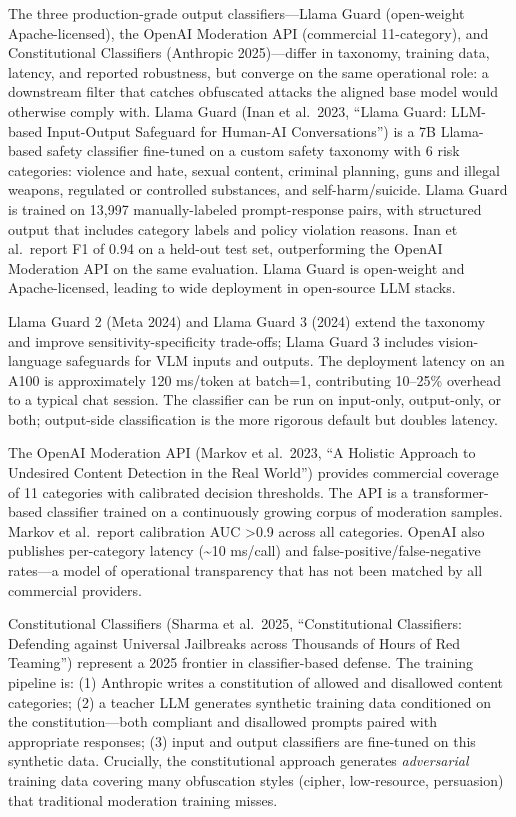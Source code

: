 The three production-grade output classifiers---Llama Guard (open-weight Apache-licensed), the OpenAI Moderation API (commercial 11-category), and Constitutional Classifiers (Anthropic 2025)---differ in taxonomy, training data, latency, and reported robustness, but converge on the same operational role: a downstream filter that catches obfuscated attacks the aligned base model would otherwise comply with. Llama Guard (Inan et al.~2023, ``Llama Guard: LLM-based Input-Output Safeguard for Human-AI Conversations'') is a 7B Llama-based safety classifier fine-tuned on a custom safety taxonomy with 6 risk categories: violence and hate, sexual content, criminal planning, guns and illegal weapons, regulated or controlled substances, and self-harm/suicide. Llama Guard is trained on 13,997 manually-labeled prompt-response pairs, with structured output that includes category labels and policy violation reasons. Inan et al.~report F1 of 0.94 on a held-out test set, outperforming the OpenAI Moderation API on the same evaluation. Llama Guard is open-weight and Apache-licensed, leading to wide deployment in open-source LLM stacks.

Llama Guard 2 (Meta 2024) and Llama Guard 3 (2024) extend the taxonomy and improve sensitivity-specificity trade-offs; Llama Guard 3 includes vision-language safeguards for VLM inputs and outputs. The deployment latency on an A100 is approximately 120 ms/token at batch=1, contributing 10--25\% overhead to a typical chat session. The classifier can be run on input-only, output-only, or both; output-side classification is the more rigorous default but doubles latency.

The OpenAI Moderation API (Markov et al.~2023, ``A Holistic Approach to Undesired Content Detection in the Real World'') provides commercial coverage of 11 categories with calibrated decision thresholds. The API is a transformer-based classifier trained on a continuously growing corpus of moderation samples. Markov et al.~report calibration AUC \textgreater0.9 across all categories. OpenAI also publishes per-category latency (\textasciitilde10 ms/call) and false-positive/false-negative rates---a model of operational transparency that has not been matched by all commercial providers.

Constitutional Classifiers (Sharma et al.~2025, ``Constitutional Classifiers: Defending against Universal Jailbreaks across Thousands of Hours of Red Teaming'') represent a 2025 frontier in classifier-based defense. The training pipeline is: (1) Anthropic writes a constitution of allowed and disallowed content categories; (2) a teacher LLM generates synthetic training data conditioned on the constitution---both compliant and disallowed prompts paired with appropriate responses; (3) input and output classifiers are fine-tuned on this synthetic data. Crucially, the constitutional approach generates \emph{adversarial} training data covering many obfuscation styles (cipher, low-resource, persuasion) that traditional moderation training misses.

